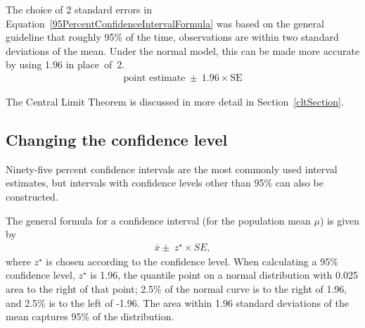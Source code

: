 \begin{spacing}{1.5}

The choice of 2 standard errors in Equation~\ref{95PercentConfidenceIntervalFormula} was based on the general guideline that roughly 95\% of the time, observations are within two standard deviations of the mean. Under the normal model, this can be made more accurate by using 1.96 in place~of~2.
\begin{align}
\text{point estimate}\ \pm\ 1.96\times \text{SE}
\label{95PercentCIWhenUsingNormalModel}
\end{align}

The Central Limit Theorem is discussed in more detail in Section~\ref{cltSection}.

\subsection{Changing the confidence level}
\label{changingTheConfidenceLevelSection}





Ninety-five percent confidence intervals are the most commonly used interval estimates, but intervals with confidence levels other than 95\% can also be constructed.

The general formula for a confidence interval (for the population mean $\mu$) is given by 
\begin{align}
	\overline{x} \pm \ z^{\star} \times SE,
\end{align}
where $z^{\star}$ is chosen according to the confidence level. When calculating a 95\% confidence level, $z^{\star}$ is 1.96, the quantile point on a normal distribution with 0.025 area to the right of that point; 2.5\% of the normal curve is to the right of 1.96, and 2.5\% is to the left of -1.96.  The area within 1.96 standard deviations of the mean captures 95\% of the distribution.


\end{spacing}

